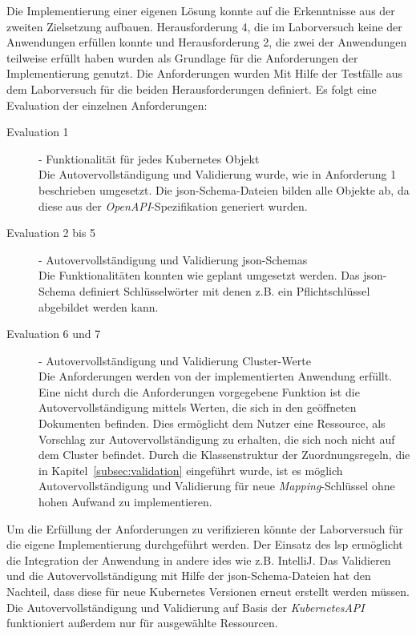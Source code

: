 Die Implementierung einer eigenen Lösung konnte auf die Erkenntnisse aus der zweiten Zielsetzung aufbauen.
Herausforderung 4, die im Laborversuch keine der Anwendungen erfüllen konnte und Herausforderung 2, die zwei der Anwendungen teilweise erfüllt haben
wurden als Grundlage für die Anforderungen der Implementierung genutzt.
Die Anforderungen wurden Mit Hilfe der Testfälle aus dem Laborversuch für die beiden Herausforderungen definiert.
Es folgt eine Evaluation der einzelnen Anforderungen:
\begin{description}
  \item[Evaluation 1]{- Funktionalität für jedes Kubernetes Objekt\\}
        Die Autovervollständigung und Validierung wurde, wie in Anforderung 1 beschrieben umgesetzt.
        Die \ac{json}-Schema-Dateien bilden alle Objekte ab, da diese aus der \textit{OpenAPI}-Spezifikation generiert wurden.
  \item[Evaluation 2 bis 5]{- Autovervollständigung und Validierung \ac{json}-Schemas\\}
        Die Funktionalitäten konnten wie geplant umgesetzt werden. Das \ac{json}-Schema
        definiert Schlüsselwörter mit denen z.B. ein Pflichtschlüssel abgebildet werden kann.
  \item[Evaluation 6 und 7]{- Autovervollständigung und Validierung Cluster-Werte\\}
        Die Anforderungen werden von der implementierten Anwendung erfüllt.
        Eine nicht durch die Anforderungen vorgegebene Funktion ist die Autovervollständigung
        mittels Werten, die sich in den geöffneten Dokumenten befinden. Dies ermöglicht dem Nutzer eine Ressource, als Vorschlag zur Autovervollständigung
        zu erhalten, die sich noch nicht auf dem Cluster befindet.
        Durch die Klassenstruktur der Zuordnungsregeln, die in Kapitel~\ref{subsec:validation} eingeführt wurde, ist
        es möglich Autovervollständigung und Validierung für neue \textit{Mapping}-Schlüssel ohne hohen Aufwand zu implementieren.

\end{description}
Um die Erfüllung der Anforderungen zu verifizieren könnte der Laborversuch für die eigene Implementierung durchgeführt werden.
Der Einsatz des \ac{lsp} ermöglicht die Integration der Anwendung in andere \ac{ide}s wie z.B. IntelliJ.
Das Validieren und die Autovervollständigung mit Hilfe der \ac{json}-Schema-Dateien hat den Nachteil, dass diese für neue Kubernetes Versionen
erneut erstellt werden müssen.
Die Autovervollständigung und Validierung auf Basis der \textit{KubernetesAPI} funktioniert außerdem nur für ausgewählte Ressourcen.

